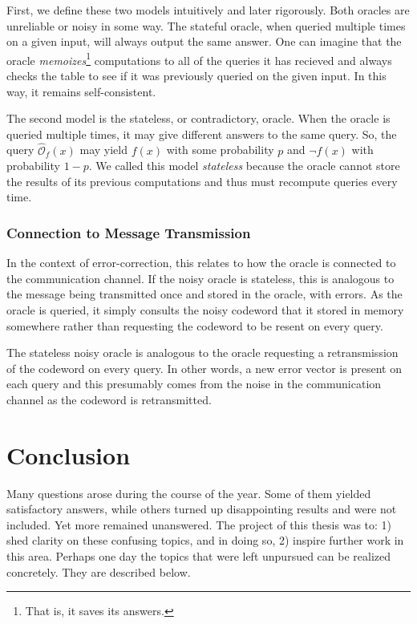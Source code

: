 \documentclass[12pt,twoside]{reedthesis}
\theoremstyle{definition}
\begin{document}
First, we define these two models intuitively and later rigorously. Both oracles are unreliable or noisy in some way. The stateful oracle, when queried multiple times on a given input, will always output the same answer. 
One can imagine that the oracle \textit{memoizes}\footnote{That is, it saves its answers.} computations to all of the queries it has recieved and always checks the table to see if it was previously queried on the given input. In this way, it remains self-consistent. 


The second model is the stateless, or contradictory, oracle. When the oracle is queried multiple times, it may give different answers to the same query. So, the query $\widehat{\mathcal{O}}_f(x)$ may yield $f(x)$ with some probability $p$ and $\lnot f(x)$ with probability $1-p$. We called this model \textit{stateless} because the oracle cannot store the results of its previous computations and thus must recompute queries every time.

\subsection{Connection to Message Transmission}

In the context of error-correction, this relates to how the oracle is connected to the communication channel. If the noisy oracle is stateless, this is analogous to the message being transmitted once and stored in the oracle, with errors. As the oracle is queried, it simply consults the noisy codeword that it stored in memory somewhere rather than requesting the codeword to be resent on every query. 

The stateless noisy oracle is analogous to the oracle requesting a retransmission of the codeword on every query. In other words, a new error vector is present on each query and this presumably comes from the noise in the communication channel as the codeword is retransmitted.




\chapter*{Conclusion}
	\setcounter{chapter}{8}
	\setcounter{section}{0}
	
Many questions arose during the course of the year. Some of them yielded satisfactory answers, while others turned up disappointing results and were not included. Yet more remained unanswered. The project of this thesis was to: 1) shed clarity on these confusing topics, and in doing so, 2) inspire further work in this area. Perhaps one day the topics that were left unpursued can be realized concretely. They are described below.
\end{document}
